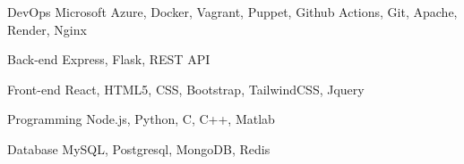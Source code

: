 

\begin{cvskills}

  \cvskill
    {DevOps} %
    {Microsoft Azure, Docker, Vagrant, Puppet, Github Actions, Git, Apache, Render, Nginx} %

  \cvskill
    {Back-end} %
    {Express, Flask, REST API} %

  \cvskill
    {Front-end} %
    {React, HTML5, CSS, Bootstrap, TailwindCSS, Jquery} %

  \cvskill
    {Programming} %
    {Node.js, Python, C, C++, Matlab} %

  \cvskill
    {Database} %
    {MySQL, Postgresql, MongoDB, Redis} %


\end{cvskills}

